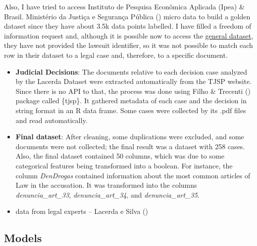 \documentclass[
  12pt,
]{article}
\begin{document}
Also, I have tried to access Instituto de Pesquisa Econômica Aplicada
(Ipea) \& Brasil. Ministério da Justiça e Segurança Pública
()
micro data to build a golden dataset since they have about 3.5k data
points labelled. I have filled a freedom of information request and,
although it is possible now to access the
\href{https://www.gov.br/mj/pt-br/assuntos/sua-protecao/politicas-sobre-drogas/pesquisa-e-informacao-3/pesquisa\%20IPEA/pesquisa-ipea-perfil-processado-e-producao-de-provas}{general
dataset}, they have not provided the lawsuit identifier, so it was not
possible to match each row in their dataset to a legal case and,
therefore, to a specific document.

\begin{itemize}
\item
  \textbf{Judicial Decisions}: The documents relative to each decision
  case analyzed by the Lacerda Dataset were extracted automatically from
  the TJSP website. Since there is no API to that, the process was done
  using Filho \& Trecenti ()
  package called \{tjsp\}. It gathered metadata of each case and the
  decision in string format in an R data frame. Some cases were
  collected by its .pdf files and read automatically.
\item
  \textbf{Final dataset}: After cleaning, some duplications were
  excluded, and some documents were not collected; the final result was
  a dataset with 258 cases. Also, the final dataset contained 50
  columns, which was due to some categorical features being transformed
  into a boolean. For instance, the column \emph{DenDrogas} contained
  information about the most common articles of Law in the accusation.
  It was transformed into the columns \emph{denuncia\_art\_33},
  \emph{denuncia\_art\_34}, and \emph{denuncia\_art\_35}.
\item
  data from legal experts -- Lacerda e Silva
  ()
\end{itemize}

\subsection{Models}\label{sec-models}
\end{document}
